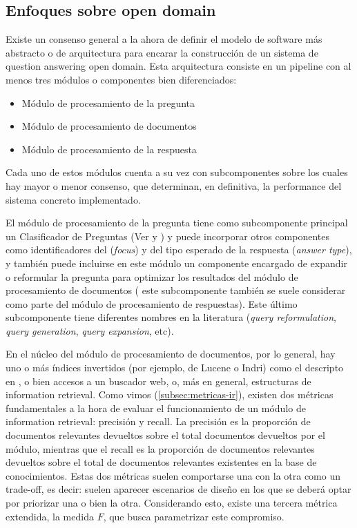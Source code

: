 \subsection{Enfoques sobre open domain}
\label{subsec:open-domain}
Existe un consenso general a la ahora de definir el modelo de software más abstracto o de arquitectura para encarar la construcción de un sistema de question answering open domain. Esta arquitectura consiste en un pipeline con al menos tres módulos o componentes bien diferenciados:
\begin{itemize}
\item Módulo de procesamiento de la pregunta
\item Módulo de procesamiento de documentos
\item Módulo de procesamiento de la respuesta
\end{itemize}

Cada uno de estos módulos cuenta a su vez con subcomponentes sobre los cuales hay mayor o menor consenso, que determinan, en definitiva, la performance del sistema concreto implementado.

El módulo de procesamiento de la pregunta tiene como subcomponente principal un Clasificador de Preguntas (Ver  y ) y puede incorporar otros componentes como identificadores del  (\textit{focus}) y del tipo esperado de la respuesta (\textit{answer type}), y también puede incluirse en este módulo un componente encargado de expandir o reformular la pregunta para optimizar los resultados del módulo de procesamiento de documentos ( este subcomponente también se suele considerar como parte del módulo de procesamiento de respuestas). Este último subcomponente tiene diferentes nombres en la literatura (\textit{query reformulation}, \textit{query generation}, \textit{query expansion}, etc).

En el núcleo del módulo de procesamiento de documentos, por lo general, hay uno o más índices invertidos (por ejemplo, de Lucene o Indri) como el descripto en , o bien accesos a un buscador web, o, más en general, estructuras de information retrieval. Como vimos (\ref{subsec:metricas-ir}), existen dos métricas fundamentales a la hora de evaluar el funcionamiento de un módulo de information retrieval: precisión y recall. La precisión es la proporción de documentos relevantes devueltos sobre el total documentos devueltos por el módulo, mientras que el recall es la proporción de documentos relevantes devueltos sobre el total de documentos relevantes existentes en la base de conocimientos. Estas dos métricas suelen comportarse una con la otra como un trade-off, es decir: suelen aparecer escenarios de diseño en los que se deberá optar por priorizar una o bien la otra. Considerando esto, existe una tercera métrica extendida, la medida $F$, que busca parametrizar este compromiso.

